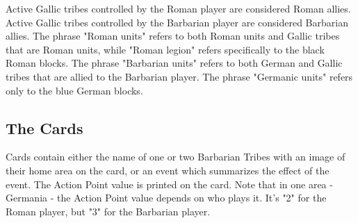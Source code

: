 Active Gallic tribes controlled by the Roman player are considered Roman allies. Active Gallic tribes controlled by the Barbarian player are considered Barbarian allies. The phrase "Roman units" refers to both Roman units and Gallic tribes that are Roman units, while "Roman legion" refers specifically to the black Roman blocks. The phrase "Barbarian units" refers to both German and Gallic tribes that are allied to the Barbarian player. The phrase "Germanic units" refers only to the blue German blocks.
\par
\subsection{The Cards}
Cards contain either the name of one or two Barbarian Tribes with an image of their home area on the card, or an event which summarizes the effect of the event. The Action Point value is printed on the card. Note that in one area - Germania - the Action Point value depends on who plays it. It's "2" for the Roman player, but "3" for the Barbarian player.